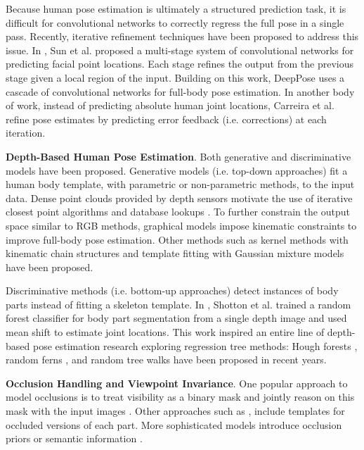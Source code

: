 \documentclass[runningheads]{llncs}
\begin{document}
	Because human pose estimation is ultimately a structured prediction task, it is difficult for convolutional networks to correctly regress the full pose in a single pass. Recently, iterative refinement techniques have been proposed to address this issue. In \cite{sun2013deep}, Sun et al. proposed a multi-stage system of convolutional networks for predicting facial point locations. Each stage refines the output from the previous stage given a local region of the input. Building on this work, DeepPose \cite{toshev2014deeppose} uses a cascade of convolutional networks for full-body pose estimation. In another body of work, instead of predicting absolute human joint locations, Carreira et al. \cite{carreira2015human} refine pose estimates by predicting error feedback (i.e. corrections) at each iteration.

	\textbf{Depth-Based Human Pose Estimation}. Both generative and discriminative models have been proposed. Generative models (i.e. top-down approaches) fit a human body template, with parametric or non-parametric methods, to the input data. Dense point clouds provided by depth sensors motivate the use of iterative closest point algorithms \cite{ganapathi2012real,grest2005nonlinear,haehnel2003extension,knoop2006sensor} and database lookups \cite{ye2011accurate}. To further constrain the output space similar to RGB methods, graphical models \cite{he2015depth,ganapathi2010real} impose kinematic constraints to improve full-body pose estimation. Other methods such as kernel methods with kinematic chain structures \cite{ding2015articulated} and template fitting with Gaussian mixture models \cite{ye2014real} have been proposed.

	Discriminative methods (i.e. bottom-up approaches) detect instances of body parts instead of fitting a skeleton template. In \cite{shotton2011real}, Shotton et al. trained a random forest classifier for body part segmentation from a single depth image and used mean shift to estimate joint locations. This work inspired an entire line of depth-based pose estimation research exploring regression tree methods: Hough forests \cite{girshick2011efficient}, random ferns \cite{hesse2015estimating}, and random tree walks \cite{yub2015random} have been proposed in recent years.

  \textbf{Occlusion Handling and Viewpoint Invariance}.
	One popular approach to model occlusions is to treat visibility as a binary mask and jointly reason on this mask with the input images \cite{rafi2015semantic,wang2013learning}. Other approaches such as \cite{azizpour2012object,ghiasi2014parsing}, include templates for occluded versions of each part. More sophisticated models introduce occlusion priors \cite{hsiao2014occlusion,bonde2014robust} or semantic information \cite{gao2011segmentation}.
\end{document}
